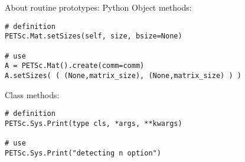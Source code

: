 \lstset{language=Python}
\begin{python}
\begin{numberedframe}{About routine prototypes: Python}
Object methods:
\begin{lstlisting}
# definition
PETSc.Mat.setSizes(self, size, bsize=None)

# use
A = PETSc.Mat().create(comm=comm)
A.setSizes( ( (None,matrix_size), (None,matrix_size) ) )
\end{lstlisting}

Class methods:
\begin{lstlisting}
# definition
PETSc.Sys.Print(type cls, *args, **kwargs)

# use
PETSc.Sys.Print("detecting n option")
\end{lstlisting}
\end{numberedframe}
\end{python}

